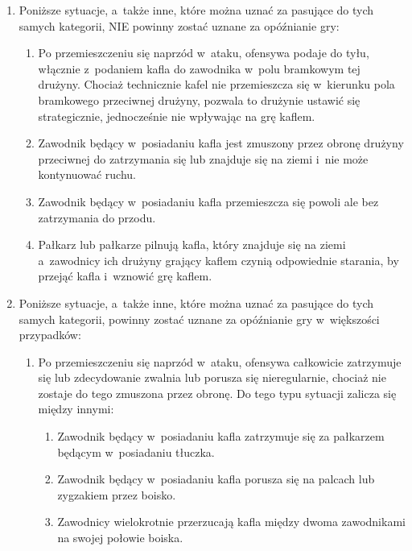 \documentclass[12pt,a4paper]{article}
\begin{document}
\begin{enumerate}
	\item Poniższe sytuacje, a~także inne, które można uznać za pasujące do
	      tych samych kategorii, NIE powinny zostać uznane za opóźnianie gry:

	      \begin{enumerate}
		      \item  Po przemieszczeniu się naprzód w~ataku, ofensywa podaje do tyłu,
		            włącznie z~podaniem kafla do zawodnika w~polu bramkowym tej drużyny. Chociaż
		            technicznie kafel nie przemieszcza się w~kierunku pola bramkowego
		            przeciwnej drużyny, pozwala to drużynie ustawić się strategicznie,
		            jednocześnie nie wpływając na grę kaflem.

		      \item Zawodnik będący w~posiadaniu kafla jest zmuszony przez obronę
		            drużyny przeciwnej do zatrzymania się lub znajduje się na ziemi i~nie może
		            kontynuować ruchu.

		      \item Zawodnik będący w~posiadaniu kafla przemieszcza się powoli ale bez zatrzymania do przodu.

		      \item Pałkarz lub pałkarze pilnują kafla, który znajduje się na ziemi a~zawodnicy ich drużyny grający kaflem czynią odpowiednie starania, by
		            przejąć kafla i~wznowić grę kaflem.
	      \end{enumerate}
	\item Poniższe sytuacje, a~także inne, które można uznać za pasujące do
	      tych samych kategorii, powinny zostać uznane za opóźnianie gry w~większości przypadków:
	      \begin{enumerate}
		      \item Po przemieszczeniu się naprzód w~ataku, ofensywa całkowicie
		            zatrzymuje się lub zdecydowanie zwalnia lub porusza się nieregularnie,
		            chociaż nie zostaje do tego zmuszona przez obronę. Do tego typu sytuacji
		            zalicza się między innymi:

		            \begin{enumerate}
			            \item
			                  Zawodnik będący w~posiadaniu kafla zatrzymuje się za pałkarzem będącym
			                  w~posiadaniu tłuczka.
			            \item
			                  Zawodnik będący w~posiadaniu kafla porusza się na palcach lub
			                  zygzakiem przez boisko.
			            \item
			                  Zawodnicy wielokrotnie przerzucają kafla między dwoma zawodnikami na swojej połowie boiska.
		            \end{enumerate}


\end{enumerate}
\end{enumerate}
\end{document}
